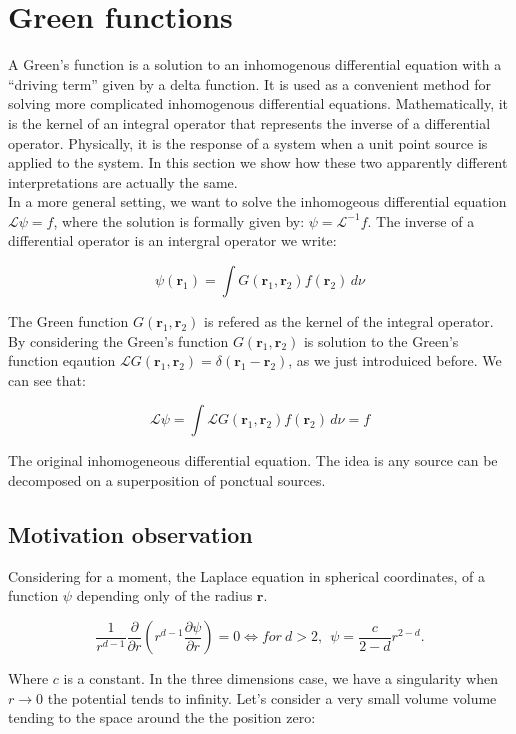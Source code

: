 \documentclass[final, paper=letter,5p,times,twocolumn]{elsarticle}
\theoremstyle{definition}
\begin{document}
{\section{Green functions}

A Green's function is a solution to an inhomogenous differential equation with a ``driving term'' given by a delta function. It is used as a convenient method for solving more complicated inhomogenous differential equations. Mathematically, it is the kernel of an integral operator that represents the inverse of a differential operator. Physically, it is the response of a system when a unit point source is applied to the system. In this section we show how these two apparently different interpretations are actually the same. \\
In a more general setting, we want to solve the inhomogeous differential equation $\mathcal{L} \psi = f$, where the solution is formally given by: $\psi = \mathcal{L}^{-1} f$. The inverse of a differential operator is an intergral operator we write:

$$
\psi(\bm{r}_{1}) = \int G(\bm{r}_{1}, \bm{r}_{2}) f(\bm{r}_{2}) \, d\nu
$$

The Green function $G(\bm{r}_{1}, \bm{r}_{2})$ is refered as the kernel of the integral operator. By considering the Green's function $G(\bm{r}_{1}, \bm{r}_{2})$ is solution to the Green's function eqaution $\mathcal{L} G(\bm{r}_{1}, \bm{r}_{2}) = \delta(\bm{r}_{1} - \bm{r}_{2})$, as we just introduiced before. We can see that:

$$
\mathcal{L} \psi = \int \mathcal{L} G(\bm{r}_{1}, \bm{r}_{2}) f(\bm{r}_{2}) \, d\nu = f
$$

The original inhomogeneous differential equation. The idea is any source can be decomposed on a superposition of ponctual sources.


\subsection{Motivation observation}

Considering for a moment, the Laplace equation in spherical coordinates, of a function $\psi$ depending only of the radius $\bm{r}$.

$$
\frac{1}{r^{d-1}}\frac{\partial}{\partial r} \left(r^{d-1} \frac{\partial \psi}{\partial r} \right) = 0  \Leftrightarrow for~d>2,~~\psi = \frac{c}{2-d}r^{2-d}.
$$

Where $c$ is a constant. In the three dimensions case, we have a singularity when $r \rightarrow 0$ the potential tends to infinity. Let's consider a very small volume volume tending to the space around the the position zero:

}
\end{document}
